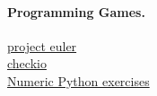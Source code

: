 \documentclass[%
oneside,                 %
final,                   %
10pt]{article}
\begin{document}
\paragraph{Programming Games.}
\href{{https://projecteuler.net/}}{project euler} \\
\href{{https://checkio.org/}}{checkio} \\
\href{{https://github.com/rougier/numpy-100/blob/master/100%20Numpy%20exercises.md}}{Numeric Python exercises} \\




\vspace{3mm}




\vspace{3mm}






\printindex
\end{document}
